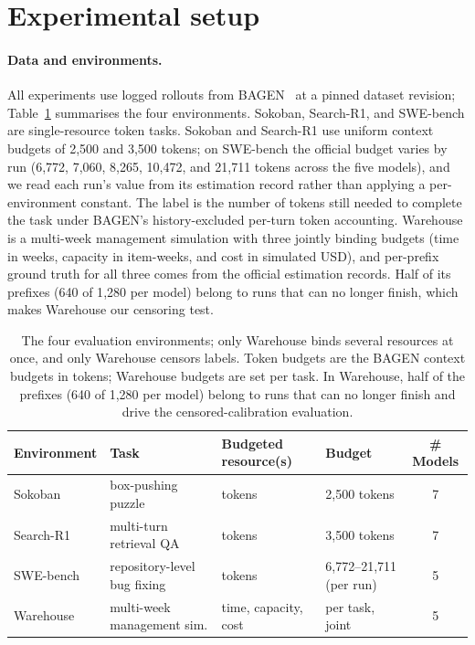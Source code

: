 \documentclass{article}
\begin{document}
\section{Experimental setup}
\label{sec:setup}

\paragraph{Data and environments.}
All experiments use logged rollouts from BAGEN~\cite{lin2026bagen} at a pinned dataset revision; Table~\ref{tab:envs} summarises the four environments. Sokoban, Search-R1, and SWE-bench are single-resource token tasks. Sokoban and Search-R1 use uniform context budgets of 2{,}500 and 3{,}500 tokens; on SWE-bench the official budget varies by run (6{,}772, 7{,}060, 8{,}265, 10{,}472, and 21{,}711 tokens across the five models), and we read each run's value from its estimation record rather than applying a per-environment constant. The label is the number of tokens still needed to complete the task under BAGEN's history-excluded per-turn token accounting. Warehouse is a multi-week management simulation with three jointly binding budgets (time in weeks, capacity in item-weeks, and cost in simulated USD), and per-prefix ground truth for all three comes from the official estimation records. Half of its prefixes (640 of 1{,}280 per model) belong to runs that can no longer finish, which makes Warehouse our censoring test.

\begin{table}[t]
\centering
\caption{The four evaluation environments; only Warehouse binds several resources at once, and only Warehouse censors labels. Token budgets are the BAGEN context budgets in tokens; Warehouse budgets are set per task. In Warehouse, half of the prefixes (640 of 1{,}280 per model) belong to runs that can no longer finish and drive the censored-calibration evaluation.}
\label{tab:envs}
\small
\begin{tabular}{@{}llllc@{}}
\toprule
Environment & Task & Budgeted resource(s) & Budget & \# Models \\
\midrule
Sokoban & box-pushing puzzle & tokens & 2{,}500 tokens & 7 \\
Search-R1 & multi-turn retrieval QA & tokens & 3{,}500 tokens & 7 \\
SWE-bench & repository-level bug fixing & tokens & 6{,}772--21{,}711 (per run) & 5 \\
Warehouse & multi-week management sim. & time, capacity, cost & per task, joint & 5 \\
\bottomrule
\end{tabular}
\end{table}
\end{document}
